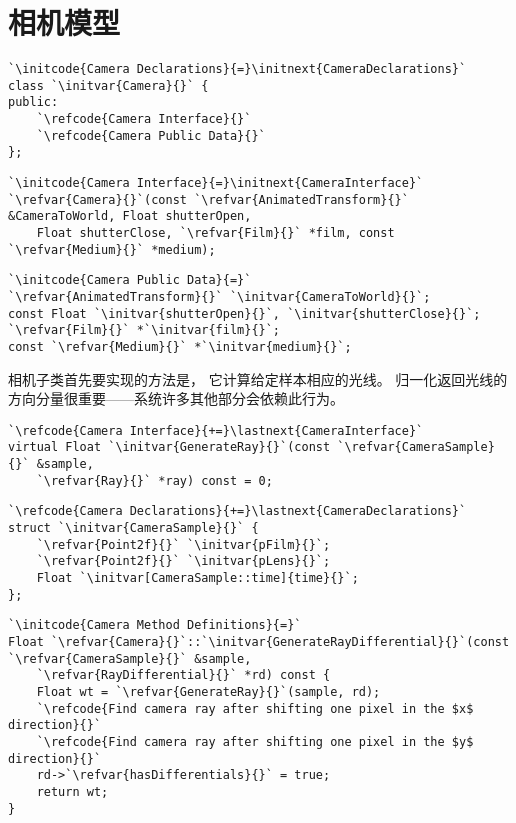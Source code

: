 \section{相机模型}\label{sec:相机模型}

\begin{lstlisting}
`\initcode{Camera Declarations}{=}\initnext{CameraDeclarations}`
class `\initvar{Camera}{}` {
public:
    `\refcode{Camera Interface}{}`
    `\refcode{Camera Public Data}{}`
};
\end{lstlisting}
\begin{lstlisting}
`\initcode{Camera Interface}{=}\initnext{CameraInterface}`
`\refvar{Camera}{}`(const `\refvar{AnimatedTransform}{}` &CameraToWorld, Float shutterOpen,
    Float shutterClose, `\refvar{Film}{}` *film, const `\refvar{Medium}{}` *medium);
\end{lstlisting}
\begin{lstlisting}
`\initcode{Camera Public Data}{=}`
`\refvar{AnimatedTransform}{}` `\initvar{CameraToWorld}{}`;
const Float `\initvar{shutterOpen}{}`, `\initvar{shutterClose}{}`;
`\refvar{Film}{}` *`\initvar{film}{}`;
const `\refvar{Medium}{}` *`\initvar{medium}{}`;
\end{lstlisting}
相机子类首先要实现的方法是，
它计算给定样本相应的光线。
归一化返回光线的方向分量很重要——系统许多其他部分会依赖此行为。
\begin{lstlisting}
`\refcode{Camera Interface}{+=}\lastnext{CameraInterface}`
virtual Float `\initvar{GenerateRay}{}`(const `\refvar{CameraSample}{}` &sample,
    `\refvar{Ray}{}` *ray) const = 0;
\end{lstlisting}
\begin{lstlisting}
`\refcode{Camera Declarations}{+=}\lastnext{CameraDeclarations}`
struct `\initvar{CameraSample}{}` {
    `\refvar{Point2f}{}` `\initvar{pFilm}{}`;
    `\refvar{Point2f}{}` `\initvar{pLens}{}`;
    Float `\initvar[CameraSample::time]{time}{}`;
};
\end{lstlisting}
\begin{lstlisting}
`\initcode{Camera Method Definitions}{=}`
Float `\refvar{Camera}{}`::`\initvar{GenerateRayDifferential}{}`(const `\refvar{CameraSample}{}` &sample,
    `\refvar{RayDifferential}{}` *rd) const {
    Float wt = `\refvar{GenerateRay}{}`(sample, rd);
    `\refcode{Find camera ray after shifting one pixel in the $x$ direction}{}`
    `\refcode{Find camera ray after shifting one pixel in the $y$ direction}{}`
    rd->`\refvar{hasDifferentials}{}` = true;
    return wt;
}
\end{lstlisting}